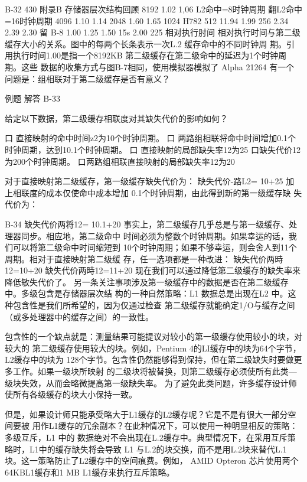 B-32
430
附录B 存储器层次结构回顾
8192
1.02
1,06
L2命中=8时钟周期
翻L2命中=16时钟周期
4096
1.10
1.14
2048
1.60
1.65
1024
H782
512
11.94
1.99
256
2.34
2.39
2.30
留 B-8
1.00
1.25
1.50
15s
2.00
225
相对执行肘间
相对执行时间与第二级缓存大小的关系。图中的每两个长条表示一次L.2 缓存命中的不同时钟周
期。引用执行时间1.00是指一个8192KB 第二级缓存在第二级命中的延迟为1个时钟周期。这些
数据的收集方式与图B-7相同，使用模拟器模拟了 Alpha 21264
有一个问题是：组相联对于第二级缓存是否有意义？

例题
解答
B-33

给定以下数据，第二级缓存相联度对其缺失代价的影响如何？

口 直接映射的命中时间z2为10个时钟周期。
口 两路组相联将命中时间增加0.1个时钟周期，达到10.1个时钟周期。
口 直接映射的局部缺失率12为25%
口缺失代价12为200个时钟周期。
口两路组相联直接映射的局部缺失率12为20%

对于直接映射第二级缓存，第一级缓存缺失代价为：
缺失代价-路L2= 10+25%
加上相联度的成本仅使命中成本增加 0.1个时钟周期，由此得到新的第一级缓存缺
失代价为：

B-34
缺失代价两将12= 10.1+20%
事实上，第二级缓存几乎总是与第一级缓存、处理器同步。相应地，第二级命中
时间必须为整数个时钟周期。如果幸运的话，我们可以将第二级命中时间缩短到
10个时钟周期；如果不够幸运，则会舍人到11个周期。相对于直接映射第二级缓
存，任一选项都是一种改进：
缺失代价两時12=10+20%
缺失代价两時12=11+20%
现在我们可以通过降低第二级缓存的缺失率来降低敏失代价了。
另一条关注事项涉及第一级缓存中的数据是否在第二级缓存中。多级包含是存储器层次结
构的一种自然策略：L1 数据总是出现在L2 中。这种包含性是我们所希望的，因为仅通过检查
第二级缓存就能确定1/O与缓存之间（或多处理器中的缓存之间）的一致性。

包含性的一个缺点就是：测量结果可能提议对较小的第一级缓存使用较小的块，对较大的
第二级缓存使用较大的块。例如，Pentium 4的LI缓存中的块为64个字节，L2缓存中的块为
128个字节。包含性仍然能够得到保持，但在第二级缺失时要做更多工作。如果一级块所映射
的二级块将被替换，则第二级缓存必须使所有此类—级块失效，从而会略微提高第一级缺失率。
为了避免此类问题，许多缓存设计师使所有各级缓存的块大小保持一致。

但是，如果设计师只能承受略大于L1缓存的L2缓存呢？它是不是有很大一部分空间要被
用作L1缓存的冗余副本？在此种情况下，可以使用一种明显相反的策略：多级互斥，L1 中的
数据绝对不会出现在L.2缓存中。典型情况下，在采用互斥策略时，L1中的缓存缺失将会导致
L1 与L.2的块交换，而不是用L.2块来替代L.1块。这一策略防止了L2缓存中的空间痕费。例如，
AMID Opteron 芯片使用两个64KBL1缓存和1 MB L1缓存来执行互斥策略。

